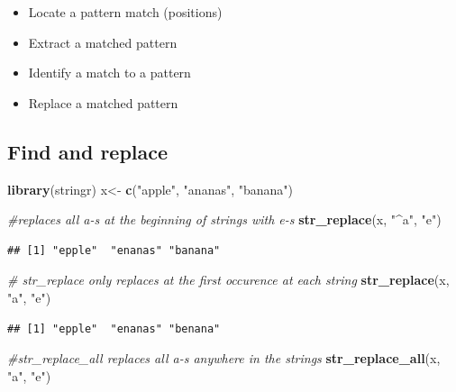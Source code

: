 \documentclass[]{book}
\newenvironment{Shaded}{\begin{snugshade}}{\end{snugshade}}
\newcommand{\KeywordTok}[1]{\textcolor[rgb]{0.13,0.29,0.53}{\textbf{#1}}}
\newcommand{\StringTok}[1]{\textcolor[rgb]{0.31,0.60,0.02}{#1}}
\newcommand{\CommentTok}[1]{\textcolor[rgb]{0.56,0.35,0.01}{\textit{#1}}}
\newcommand{\NormalTok}[1]{#1}
\providecommand{\tightlist}{%
  \setlength{\itemsep}{0pt}\setlength{\parskip}{0pt}}
\begin{document}
\begin{itemize}
\tightlist
\item
  Locate a pattern match (positions)
\item
  Extract a matched pattern
\item
  Identify a match to a pattern
\item
  Replace a matched pattern
\end{itemize}

\subsection{Find and replace}\label{find-and-replace}

\begin{Shaded}
\begin{Highlighting}[]
\KeywordTok{library}\NormalTok{(stringr)}
\NormalTok{x<-}\StringTok{ }\KeywordTok{c}\NormalTok{(}\StringTok{"apple"}\NormalTok{, }\StringTok{"ananas"}\NormalTok{, }\StringTok{"banana"}\NormalTok{)}

\CommentTok{#replaces all a-s at the beginning of strings with e-s}
\KeywordTok{str_replace}\NormalTok{(x, }\StringTok{"^a"}\NormalTok{, }\StringTok{"e"}\NormalTok{) }
\end{Highlighting}
\end{Shaded}

\begin{verbatim}
## [1] "epple"  "enanas" "banana"
\end{verbatim}

\begin{Shaded}
\begin{Highlighting}[]
\CommentTok{# str_replace only replaces at the first occurence at each string}
\KeywordTok{str_replace}\NormalTok{(x, }\StringTok{"a"}\NormalTok{, }\StringTok{"e"}\NormalTok{) }
\end{Highlighting}
\end{Shaded}

\begin{verbatim}
## [1] "epple"  "enanas" "benana"
\end{verbatim}

\begin{Shaded}
\begin{Highlighting}[]
\CommentTok{#str_replace_all replaces all a-s anywhere in the strings}
\KeywordTok{str_replace_all}\NormalTok{(x, }\StringTok{"a"}\NormalTok{, }\StringTok{"e"}\NormalTok{) }
\end{Highlighting}
\end{Shaded}
\end{document}
